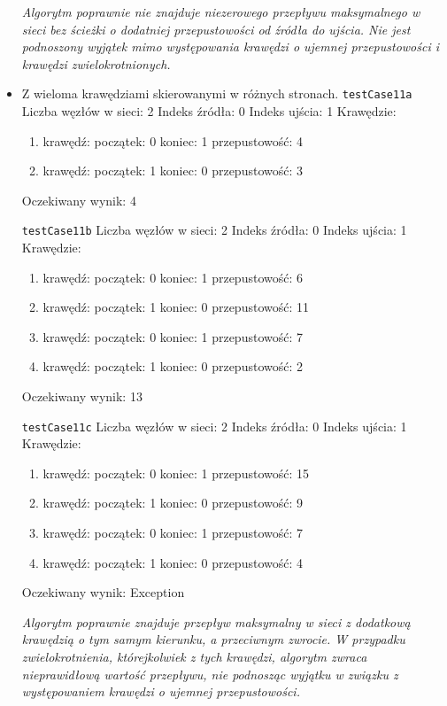 \begin{itemize}[nosep]
    \emph{Algorytm poprawnie
    nie znajduje niezerowego przepływu maksymalnego w sieci bez ścieżki
    o dodatniej przepustowości od źródła do ujścia. Nie jest podnoszony
    wyjątek mimo występowania krawędzi o ujemnej przepustowości i krawędzi
    zwielokrotnionych.}

    \item Z wieloma krawędziami skierowanymi w różnych stronach.
    \texttt{testCase11a}
    Liczba węzłów w sieci: 2
    Indeks źródła: 0
    Indeks ujścia: 1
    Krawędzie:
    \begin{enumerate}[nosep]
        \item krawędź:
        początek: 0
        koniec: 1
        przepustowość: 4
        \item krawędź:
        początek: 1
        koniec: 0
        przepustowość: 3
    \end{enumerate}
    Oczekiwany wynik: 4

    \texttt{testCase11b}
    Liczba węzłów w sieci: 2
    Indeks źródła: 0
    Indeks ujścia: 1
    Krawędzie:
    \begin{enumerate}[nosep]
        \item krawędź:
        początek: 0
        koniec: 1
        przepustowość: 6
        \item krawędź:
        początek: 1
        koniec: 0
        przepustowość: 11
        \item krawędź:
        początek: 0
        koniec: 1
        przepustowość: 7
        \item krawędź:
        początek: 1
        koniec: 0
        przepustowość: 2
    \end{enumerate}
    Oczekiwany wynik: 13

    \texttt{testCase11c}
    Liczba węzłów w sieci: 2
    Indeks źródła: 0
    Indeks ujścia: 1
    Krawędzie:
    \begin{enumerate}[nosep]
        \item krawędź:
        początek: 0
        koniec: 1
        przepustowość: 15
        \item krawędź:
        początek: 1
        koniec: 0
        przepustowość: 9
        \item krawędź:
        początek: 0
        koniec: 1
        przepustowość: 7
        \item krawędź:
        początek: 1
        koniec: 0
        przepustowość: 4
    \end{enumerate}
    Oczekiwany wynik: Exception

    \emph{Algorytm poprawnie znajduje przepływ maksymalny w sieci z dodatkową krawędzią
    o tym samym kierunku, a przeciwnym zwrocie. W przypadku zwielokrotnienia,
    którejkolwiek z tych krawędzi, algorytm zwraca nieprawidłową wartość
    przepływu, nie podnosząc wyjątku w związku z występowaniem krawędzi
    o ujemnej przepustowości.}

\end{itemize}


